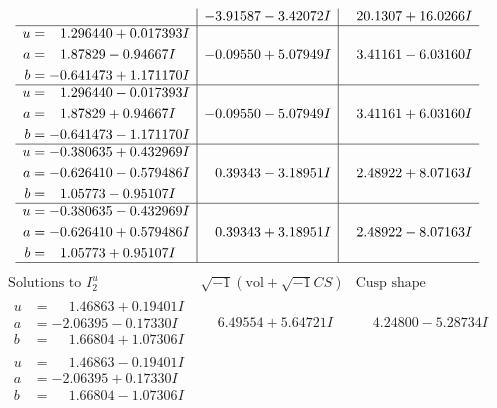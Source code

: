 \documentclass[1p]{elsarticle_modified}
\theoremstyle{definition}
\newcommand{\I}{\sqrt{-1}}
\begin{document}
$$\begin{array}{c|c|c}
 & -3.91587 - 3.42072 I & \phantom{-}20.1307 + 16.0266 I \\ \hline\begin{aligned}
u &= \phantom{-}1.296440 + 0.017393 I \\
a &= \phantom{-}1.87829 - 0.94667 I \\
b &= -0.641473 + 1.171170 I\end{aligned}
 & -0.09550 + 5.07949 I & \phantom{-}3.41161 - 6.03160 I \\ \hline\begin{aligned}
u &= \phantom{-}1.296440 - 0.017393 I \\
a &= \phantom{-}1.87829 + 0.94667 I \\
b &= -0.641473 - 1.171170 I\end{aligned}
 & -0.09550 - 5.07949 I & \phantom{-}3.41161 + 6.03160 I \\ \hline\begin{aligned}
u &= -0.380635 + 0.432969 I \\
a &= -0.626410 - 0.579486 I \\
b &= \phantom{-}1.05773 - 0.95107 I\end{aligned}
 & \phantom{-}0.39343 - 3.18951 I & \phantom{-}2.48922 + 8.07163 I \\ \hline\begin{aligned}
u &= -0.380635 - 0.432969 I \\
a &= -0.626410 + 0.579486 I \\
b &= \phantom{-}1.05773 + 0.95107 I\end{aligned}
 & \phantom{-}0.39343 + 3.18951 I & \phantom{-}2.48922 - 8.07163 I\\
 \hline 
 \end{array}$$\newpage$$\begin{array}{c|c|c}  
\text{Solutions to }I^u_{2}& \I (\text{vol} + \sqrt{-1}CS) & \text{Cusp shape}\\
 \hline 
\begin{aligned}
u &= \phantom{-}1.46863 + 0.19401 I \\
a &= -2.06395 - 0.17330 I \\
b &= \phantom{-}1.66804 + 1.07306 I\end{aligned}
 & \phantom{-}6.49554 + 5.64721 I & \phantom{-}4.24800 - 5.28734 I \\ \hline\begin{aligned}
u &= \phantom{-}1.46863 - 0.19401 I \\
a &= -2.06395 + 0.17330 I \\
b &= \phantom{-}1.66804 - 1.07306 I\end{aligned}

\end{array}$$
\end{document}

